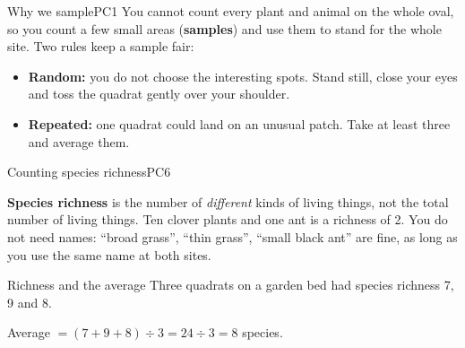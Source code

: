 
\begin{technique}{Why we sample}{PC1}
You cannot count every plant and animal on the whole oval, so you count a few small areas (\textbf{samples}) and use them to stand for the whole site. Two rules keep a sample fair:
\begin{itemize}[leftmargin=1.4em, itemsep=1pt, topsep=3pt]
  \item \textbf{Random:} you do not choose the interesting spots. Stand still, close your eyes and toss the quadrat gently over your shoulder.
  \item \textbf{Repeated:} one quadrat could land on an unusual patch. Take at least three and average them.
\end{itemize}
\end{technique}

\begin{technique}{Counting species richness}{PC6}
\begin{minipage}[c]{0.6\linewidth}
\textbf{Species richness} is the number of \emph{different} kinds of living things, not the total number of living things. Ten clover plants and one ant is a richness of 2. You do not need names: ``broad grass'', ``thin grass'', ``small black ant'' are fine, as long as you use the same name at both sites.
\end{minipage}\hfill
\begin{minipage}[c]{0.36\linewidth}\centering
{}
\end{minipage}
\end{technique}

\begin{workedex}{Richness and the average}
Three quadrats on a garden bed had species richness 7, 9 and 8.

\smallskip
Average $= (7 + 9 + 8) \div 3 = 24 \div 3 = 8$ species.
\end{workedex}

